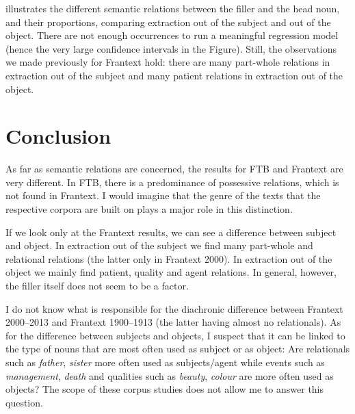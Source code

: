  illustrates the different semantic relations between the filler and the head noun, and their proportions, comparing extraction out of the subject and out of the object. There are not enough occurrences to run a meaningful regression model (hence the very large confidence intervals in the Figure). Still, the observations we made previously for Frantext hold: there are many part-whole relations in extraction out of the subject and many patient relations in extraction out of the object. 

\section{Conclusion}

As far as semantic relations are concerned, the results for FTB and Frantext are very different. In FTB, there is a predominance of possessive relations, which is not found in Frantext. I would imagine that the genre of the texts that the respective corpora are built on plays a major role in this distinction. 

If we look only at the Frantext results, we can see a difference between subject and object. In extraction out of the subject we find many part-whole and relational relations (the latter only in Frantext 2000). In extraction out of the object we mainly find patient, quality and agent relations. In general, however, the filler itself does not seem to be a factor. 

I do not know what is responsible for the diachronic difference between Frantext 2000--2013 and Frantext 1900--1913 (the latter having almost no relationals). As for the difference between subjects and objects, I suspect that it can be linked to the type of nouns that are most often used as subject or as object: Are relationals such as \textit{father}, \textit{sister} more often used as subjects/agent while events such as \textit{management}, \textit{death} and qualities such as \textit{beauty}, \textit{colour} are more often used as objects? The scope of these corpus studies does not allow me to answer this question.
